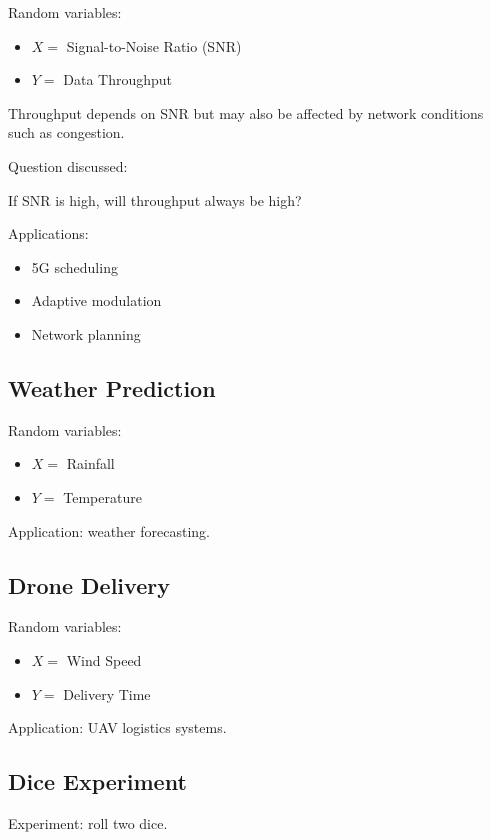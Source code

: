 \documentclass[12pt]{article}
\begin{document}
Random variables:

\begin{itemize}
\item $X =$ Signal-to-Noise Ratio (SNR)
\item $Y =$ Data Throughput
\end{itemize}

Throughput depends on SNR but may also be affected by network conditions such as congestion.

Question discussed:

If SNR is high, will throughput always be high?

Applications:

\begin{itemize}
\item 5G scheduling
\item Adaptive modulation
\item Network planning
\end{itemize}

\subsection{Weather Prediction}

Random variables:

\begin{itemize}
\item $X =$ Rainfall
\item $Y =$ Temperature
\end{itemize}

Application: weather forecasting.

\subsection{Drone Delivery}

Random variables:

\begin{itemize}
\item $X =$ Wind Speed
\item $Y =$ Delivery Time
\end{itemize}

Application: UAV logistics systems.

\subsection{Dice Experiment}

Experiment: roll two dice.
\end{document}

